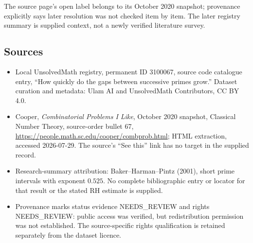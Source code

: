 \documentclass[11pt]{article}
\begin{document}
The source page's open label belongs to its October 2020 snapshot; provenance explicitly says later resolution was not checked item by item. The later registry summary is supplied context, not a newly verified literature survey.
\subsection{Sources}
\begin{itemize}
\item Local UnsolvedMath registry, permanent ID 3100067, source code catalogue entry, ``How quickly do the gaps between successive primes grow.'' Dataset curation and metadata: Ulam AI and UnsolvedMath Contributors, CC BY 4.0.
\item Cooper, \emph{Combinatorial Problems I Like}, October 2020 snapshot, Classical Number Theory, source-order bullet 67, \url{https://people.math.sc.edu/cooper/combprob.html}; HTML extraction, accessed 2026-07-29. The source's ``See this'' link has no target in the supplied record.
\item Research-summary attribution: Baker--Harman--Pintz (2001), short prime intervals with exponent $0.525$. No complete bibliographic entry or locator for that result or the stated RH estimate is supplied.
\item Provenance marks status evidence NEEDS\_REVIEW and rights NEEDS\_REVIEW: public access was verified, but redistribution permission was not established. The source-specific rights qualification is retained separately from the dataset licence.
\end{itemize}
\end{document}
